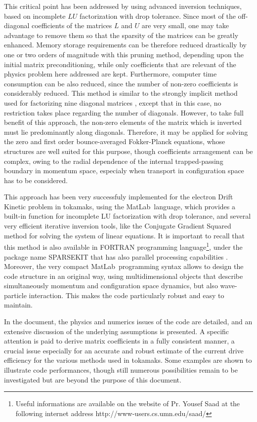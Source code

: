 This critical point has been addressed by using advanced inversion
techniques, based on incomplete $LU$ factorization with drop tolerance.
Since most of the off-diagonal coefficients of the matrices $L$ and $U$ are
very small, one may take advantage to remove them so that the sparsity of
the matrices can be greatly enhanced. Memory storage requirements can be
therefore reduced drastically by one or two orders of magnitude with this
pruning method, depending upon the initial matrix preconditioning, while
only coefficients that are relevant of the physics problem here addressed
are kept. Furthermore, computer time consumption can be also reduced, since
the number of non-zero coefficients is considerably reduced. This method is
similar to the strongly implicit method used for factorizing nine diagonal
matrices \cite{pey98}, except that in this case, no restriction takes place
regarding the number of diagonals. However, to take full benefit of this
approach, the non-zero elements of the matrix which is inverted must lie
predominantly along diagonals. Therefore, it may be applied for solving the
zero and first order bounce-averaged Fokker-Planck equations, whose
structures are well suited for this purpose, though coefficients arrangement
can be complex, owing to the radial dependence of the internal
trapped-passing boundary in momentum space, especialy when transport in
configuration space has to be considered.

This approach has been very successfuly implemented for the electron Drift
Kinetic problem in tokamaks, using the MatLab\ language, which provides a
built-in function for incomplete LU factorization with drop tolerance, and
several very efficient iterative inversion tools, like the Conjugate
Gradient Squared method for solving the system of linear equations. It
is important to recall that this method is also available in FORTRAN
programming language\footnote{Useful informations are available on the website of Pr. Yousef Saad
at the following internet address http://www-users.cs.umn.edu/saad/}, under the package name
SPARSEKIT that has also parallel processing capabilities \cite{saa03}.
Moreover, the very compact MatLab\ programming syntax allows to design the
code structure in an original way, using multidimensional objects that
describe simultaneously momentum and configuration space dynamics, but also
wave-particle interaction. This makes the code particularly robust and easy
to maintain.

In the document, the physics and numerics issues of the code are detailed,
and an extensive discussion of the underlying assumptions is presented. A
specific attention is paid to derive matrix coefficients in a fully
consistent manner, a crucial issue especially for an accurate and robust
estimate of the current drive efficiency for the various methods used in tokamaks. Some examples
are shown to illustrate code performances, though still numerous
possibilities remain to be investigated but are beyond the purpose of
this document.

